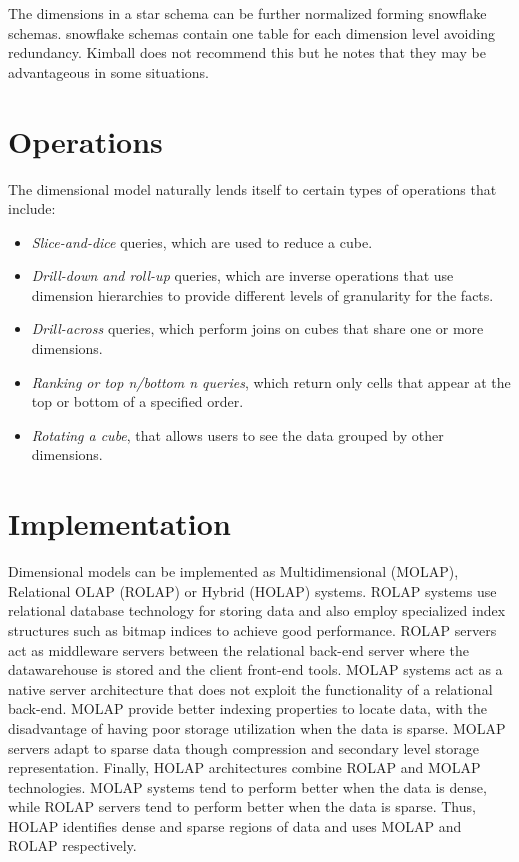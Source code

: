 \documentclass[]{article}
\begin{document}
The dimensions in a star schema can be further normalized forming snowflake schemas. snowflake schemas contain one table for each
dimension level avoiding redundancy. Kimball does not recommend this but he notes that they may be advantageous in some situations.


\section{Operations} %
\label{sec:operations}
The dimensional model naturally lends itself to certain types of operations that include:

\begin{itemize}
	\item \emph{Slice-and-dice} queries, which are used to reduce a cube. 
	\item \emph{Drill-down and roll-up} queries, which are inverse operations that use dimension hierarchies to provide different levels of granularity for the facts.
	\item \emph{Drill-across} queries, which perform joins on cubes that share one or more dimensions. 
	\item \emph{Ranking or top n/bottom n queries}, which return only cells that appear at the top or bottom of a specified order.
	\item \emph{Rotating a cube}, that allows users to see the data grouped by other dimensions.
\end{itemize}



\section{Implementation} %
\label{sec:implementation}

Dimensional models can be implemented as Multidimensional (MOLAP), Relational OLAP (ROLAP) or Hybrid (HOLAP) systems. ROLAP systems use
relational database technology for storing data and also employ specialized index structures such as bitmap indices to achieve good
performance. ROLAP servers act as middleware servers between the relational back-end server where the datawarehouse is stored and the
client front-end tools. MOLAP systems act as a native server architecture that does not exploit the functionality of a relational
back-end. MOLAP provide better indexing properties to locate data, with the disadvantage of having poor storage utilization when the
data is sparse. MOLAP servers adapt to sparse data though compression and secondary level storage representation. Finally, HOLAP
architectures combine ROLAP and MOLAP technologies. MOLAP systems tend to perform better when the data is dense, while ROLAP servers
tend to perform better when the data is sparse. Thus, HOLAP identifies dense and sparse regions of data and uses MOLAP and ROLAP
respectively.
\end{document}
